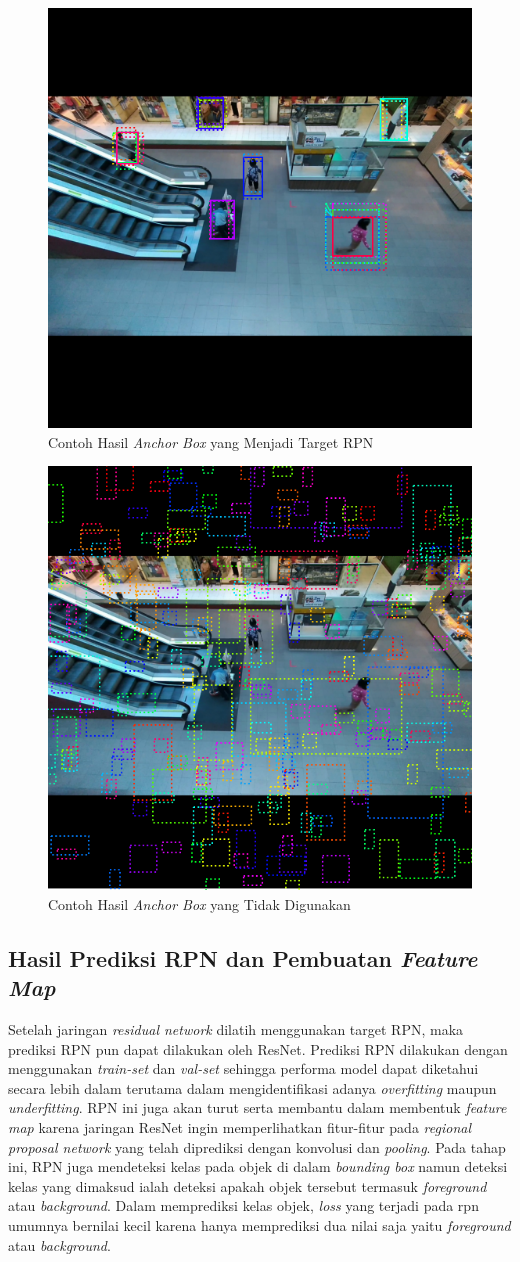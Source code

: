 \begin{figure}[h!]
  \begin{center}
    \includegraphics[width= 0.5\linewidth]{bab4/Anchor Box Positive.png}
    \caption{Contoh Hasil \textit{Anchor Box} yang Menjadi Target RPN}
    \label{fig: Anchor Box Positive}
  \end{center}
\end{figure}

\begin{figure}[h!]
  \begin{center}
    \includegraphics[width= 0.45\linewidth]{bab4/Anchor Box Negative.png}
    \caption{Contoh Hasil \textit{Anchor Box} yang Tidak Digunakan}
    \label{fig: Anchor Box Negative}
  \end{center}
\end{figure}

\subsection{Hasil Prediksi RPN dan Pembuatan \textit{Feature Map}}
Setelah jaringan \textit{residual network} dilatih menggunakan target RPN, maka prediksi RPN pun dapat dilakukan
oleh ResNet. Prediksi RPN dilakukan dengan menggunakan \textit{train-set} dan \textit{val-set} sehingga performa
model dapat diketahui secara lebih dalam terutama dalam mengidentifikasi adanya \textit{overfitting} maupun
\textit{underfitting}. RPN ini juga akan turut serta membantu dalam membentuk \textit{feature map} karena
jaringan ResNet ingin memperlihatkan fitur-fitur pada \textit{regional proposal network} yang telah diprediksi
dengan konvolusi dan \textit{pooling}. Pada tahap ini, RPN juga mendeteksi kelas pada objek di dalam \textit{bounding box}
namun deteksi kelas yang dimaksud ialah deteksi apakah objek tersebut termasuk \textit{foreground} atau 
\textit{background}. Dalam memprediksi kelas objek, \textit{loss} yang terjadi pada rpn umumnya bernilai
kecil karena hanya memprediksi dua nilai saja yaitu \textit{foreground} atau \textit{background}.

